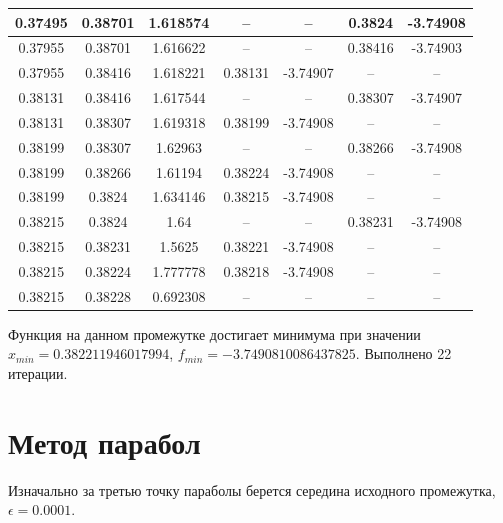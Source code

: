 \documentclass[12pt]{article}
\begin{document}
\begin{table}[h]
\begin{tabular}{|c|c|c|c|c|c|c|}
0.37495 & 0.38701 & 1.618574 & --      & --       & 0.3824  & -3.74908 \\ \hline
0.37955 & 0.38701 & 1.616622 & --      & --       & 0.38416 & -3.74903 \\ \hline
0.37955 & 0.38416 & 1.618221 & 0.38131 & -3.74907 & --      & --       \\ \hline
0.38131 & 0.38416 & 1.617544 & --      & --       & 0.38307 & -3.74907 \\ \hline
0.38131 & 0.38307 & 1.619318 & 0.38199 & -3.74908 & --      & --       \\ \hline
0.38199 & 0.38307 & 1.62963  & --      & --       & 0.38266 & -3.74908 \\ \hline
0.38199 & 0.38266 & 1.61194  & 0.38224 & -3.74908 & --      & --       \\ \hline
0.38199 & 0.3824  & 1.634146 & 0.38215 & -3.74908 & --      & --       \\ \hline
0.38215 & 0.3824  & 1.64     & --      & --       & 0.38231 & -3.74908 \\ \hline
0.38215 & 0.38231 & 1.5625   & 0.38221 & -3.74908 & --      & --       \\ \hline
0.38215 & 0.38224 & 1.777778 & 0.38218 & -3.74908 & --      & --       \\ \hline
0.38215 & 0.38228 & 0.692308 & --      & --       & --      & --       \\ \hline
\end{tabular}
\end{table}

Функция на данном промежутке достигает минимума при значении $x_{min} = 0.382211946017994$, $f_{min} = -3.7490810086437825$. Выполнено 22 итерации.

\newpage
\section{Метод парабол}

Изначально за третью точку параболы берется середина исходного промежутка, $\epsilon = 0.0001$.
\end{document}
